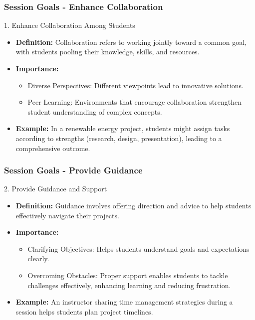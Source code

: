 \documentclass[aspectratio=169]{beamer}
\begin{document}
\begin{frame}[fragile]
    \frametitle{Session Goals - Enhance Collaboration}
    \begin{block}{1. Enhance Collaboration Among Students}
        \begin{itemize}
            \item \textbf{Definition:} Collaboration refers to working jointly toward a common goal, with students pooling their knowledge, skills, and resources.
            \item \textbf{Importance:}
            \begin{itemize}
                \item Diverse Perspectives: Different viewpoints lead to innovative solutions.
                \item Peer Learning: Environments that encourage collaboration strengthen student understanding of complex concepts.
            \end{itemize}
            \item \textbf{Example:} In a renewable energy project, students might assign tasks according to strengths (research, design, presentation), leading to a comprehensive outcome.
        \end{itemize}
    \end{block}
\end{frame}

\begin{frame}[fragile]
    \frametitle{Session Goals - Provide Guidance}
    \begin{block}{2. Provide Guidance and Support}
        \begin{itemize}
            \item \textbf{Definition:} Guidance involves offering direction and advice to help students effectively navigate their projects.
            \item \textbf{Importance:}
            \begin{itemize}
                \item Clarifying Objectives: Helps students understand goals and expectations clearly.
                \item Overcoming Obstacles: Proper support enables students to tackle challenges effectively, enhancing learning and reducing frustration.
            \end{itemize}
            \item \textbf{Example:} An instructor sharing time management strategies during a session helps students plan project timelines.
        \end{itemize}
    \end{block}
\end{frame}
\end{document}
